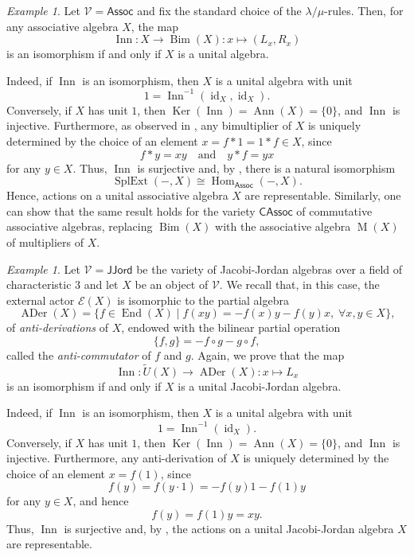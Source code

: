 \documentclass[reqno,a4paper]{amsart}
\theoremstyle{plain}
\theoremstyle{definition}
\theoremstyle{remark}
\newtheorem{example}[subsection]{Example}
\numberwithin{equation}{section}
\newcommand{\E}{\mathcal{E}}
\newcommand{\V}{\mathcal{V}}
\DeclareMathOperator{\Ker}{Ker}
\DeclareMathOperator{\Hom}{Hom}
\DeclareMathOperator{\Bim}{Bim}
\DeclareMathOperator{\SplExt}{SplExt}
\DeclareMathOperator{\End}{End}
\DeclareMathOperator{\ADer}{ADer}
\DeclareMathOperator{\Inn}{Inn}
\DeclareMathOperator{\M}{M}
\DeclareMathOperator{\Ann}{Ann}
\DeclareMathOperator{\id}{id}
\newcommand{\Assoc}{\ensuremath{\mathsf{Assoc}}}
\newcommand{\CAssoc}{\ensuremath{\mathsf{CAssoc}}}
\newcommand{\JJord}{\ensuremath{\mathsf{JJord}}}
\begin{document}
\begin{example}\label{ex_assoc}
Let $\V=\Assoc$ and fix the standard choice of the $\lambda/\mu$-rules. Then, for any associative algebra $X$, the map
\[
\Inn \colon X \to \Bim(X) \colon x \mapsto (L_x,R_x)
\]
is an isomorphism if and only if $X$ is a unital algebra.

Indeed, if $\Inn$ is an isomorphism, then $X$ is a unital algebra with unit
\[
1=\Inn^{-1}(\id_X,\id_X).
\]
Conversely, if $X$ has unit $1$, then $\Ker(\Inn)=\Ann(X)=\{ 0 \}$, and $\Inn$ is injective. Furthermore, as observed in \cite[Remark 3.8]{WRAAlg}, any bimultiplier of $X$ is uniquely determined by the choice of an element $x=f \ast 1 = 1 \ast f \in X$, since
\[
f \ast y = xy \quad \text{and} \quad y \ast f = yx
\]
for any $y \in X$. Thus, $\Inn$ is surjective and, by , there is a natural isomorphism
\[
\SplExt(-,X) \cong \Hom_\Assoc(-,X).
\]
Hence, actions on a unital associative algebra $X$ are representable. Similarly, one can show that the same result holds for the variety $\CAssoc$ of commutative associative algebras, replacing $\Bim(X)$ with the associative algebra $\M(X)$ of multipliers of $X$.
\end{example}

\begin{example}\label{ex_jjord}
Let $\V=\JJord$ be the variety of Jacobi-Jordan algebras over a field of characteristic $3$ and let $X$ be an object of $\V$. We recall that, in this case, the external actor $\E(X)$ is isomorphic to the partial algebra
\[
\ADer(X)=\{ f \in \End(X) \mid f(xy) = -f(x)y - f(y)x, \; \forall x,y \in X \},
\]
of \emph{anti-derivations} of $X$, endowed with the bilinear partial operation
\[
\{ f,g \} = -f \circ g - g \circ f,
\]
called the \emph{anti-commutator} of $f$ and $g$. Again, we prove that the map
\[
\Inn \colon \widetilde{U}(X) \to \ADer(X) \colon x \mapsto L_x
\]
is an isomorphism if and only if $X$ is a unital Jacobi-Jordan algebra.

Indeed, if $\Inn$ is an isomorphism, then $X$ is a unital algebra with unit
\[
1=\Inn^{-1}(\id_X).
\]
Conversely, if $X$ has unit $1$, then $\Ker(\Inn)=\Ann(X)=\{ 0 \}$, and $\Inn$ is injective. Furthermore, any anti-derivation of $X$ is uniquely determined by the choice of an element $x=f(1)$, since
\[
f(y)=f(y \cdot 1)=-f(y)1-f(1)y
\]
for any $y \in X$, and hence
\[
f(y)=f(1)y=xy.
\]
Thus, $\Inn$ is surjective and, by , the actions on a unital Jacobi-Jordan algebra $X$ are representable.
\end{example}
\end{document}
